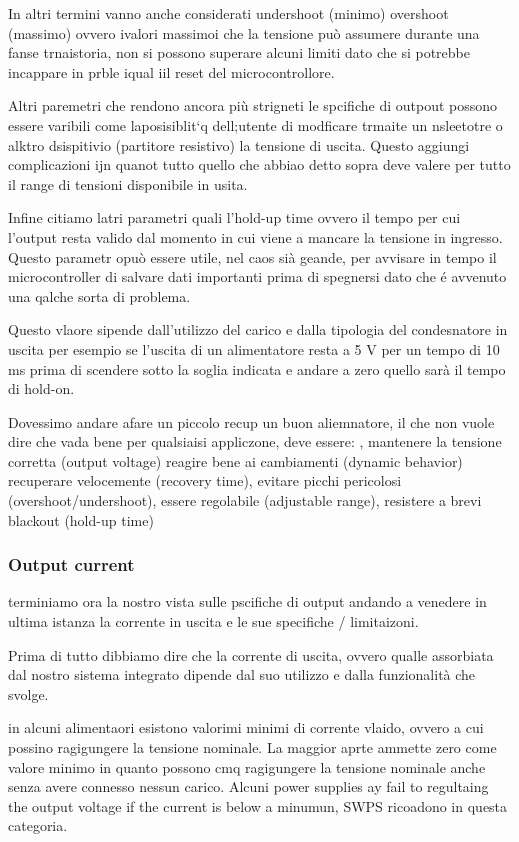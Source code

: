 \documentclass[../main.tex]{subfiles}
\begin{document}

In altri termini vanno anche considerati undershoot (minimo) overshoot (massimo) ovvero ivalori massimoi che la tensione può assumere durante una fanse trnaistoria, non si possono superare alcuni limiti dato che si potrebbe incappare in prble iqual iil reset del microcontrollore.

Altri paremetri che rendono ancora più strigneti le spcifiche di outpout possono essere varibili come laposisiblit`q dell;utente di modficare trmaite un nsleetotre o alktro dsispitivio (partitore resistivo) la tensione di uscita.
Questo aggiungi complicazioni ijn quanot tutto quello che abbiao detto sopra deve valere per tutto il range di tensioni disponibile in usita.

Infine citiamo latri parametri quali l'hold-up time ovvero il tempo per cui l'output resta valido dal momento in cui viene a mancare la tensione in ingresso. Questo parametr opuò essere utile, nel caos sià geande, per avvisare in tempo il microcontroller di salvare dati importanti prima di spegnersi dato che é avvenuto una qalche sorta di problema.

Questo vlaore sipende dall'utilizzo del carico e dalla tipologia del condesnatore in uscita per esempio se l'uscita di un alimentatore resta a 5 V per un tempo di 10 ms prima di scendere sotto la soglia indicata e andare a zero quello sarà il tempo di hold-on.

Dovessimo andare afare un piccolo recup un buon aliemnatore, il che non vuole dire che vada bene per qualsiaisi appliczone, deve essere:
, mantenere la tensione corretta (output voltage) reagire bene ai cambiamenti (dynamic behavior) recuperare velocemente (recovery time), evitare picchi pericolosi (overshoot/undershoot), essere regolabile (adjustable range), resistere a brevi blackout (hold-up time)


\subsubsection*{Output current}

terminiamo ora la nostro vista sulle pscifiche di output andando a venedere in ultima istanza la corrente in uscita e le sue specifiche / limitaizoni.

Prima di tutto dibbiamo dire che la corrente di uscita, ovvero qualle assorbiata dal nostro sistema integrato dipende dal suo utilizzo e dalla funzionalità che svolge.

in alcuni alimentaori esistono valorimi minimi di corrente vlaido, ovvero a cui possino ragigungere la tensione nominale. La maggior aprte ammette zero come valore minimo in quanto possono cmq ragigungere la tensione nominale anche senza avere connesso nessun carico.
Alcuni power supplies ay fail to regultaing the output voltage if the current is below a minumun, SWPS ricoadono in questa categoria.
\end{document}
